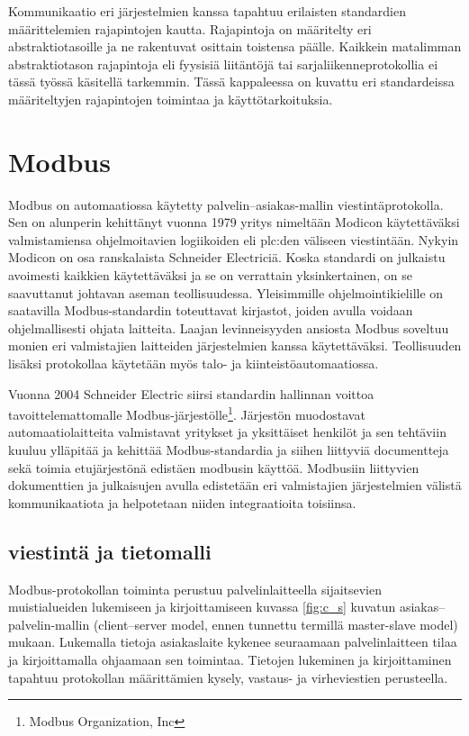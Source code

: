 Kommunikaatio eri järjestelmien kanssa tapahtuu erilaisten standardien määrittelemien rajapintojen kautta. Rajapintoja on määritelty eri abstraktiotasoille ja ne rakentuvat osittain toistensa päälle. Kaikkein matalimman abstraktiotason rajapintoja eli fyysisiä liitäntöjä tai sarjaliikenneprotokollia ei tässä työssä käsitellä tarkemmin. Tässä kappaleessa on kuvattu eri standardeissa määriteltyjen rajapintojen toimintaa ja käyttötarkoituksia.

\section{Modbus}

  Modbus on automaatiossa käytetty palvelin--asiakas-mallin viestintäprotokolla. Sen on alunperin kehittänyt vuonna 1979 yritys nimeltään Modicon käytettäväksi valmistamiensa ohjelmoitavien logiikoiden eli \Gls{plc}:den väliseen viestintään. Nykyin Modicon on osa ranskalaista Schneider Electriciä. Koska standardi on julkaistu avoimesti kaikkien käytettäväksi ja se on verrattain yksinkertainen, on se saavuttanut johtavan aseman teollisuudessa. Yleisimmille ohjelmointikielille on saatavilla Modbus-standardin toteuttavat kirjastot, joiden avulla voidaan ohjelmallisesti ohjata laitteita. Laajan levinneisyyden ansiosta Modbus soveltuu monien eri valmistajien laitteiden järjestelmien kanssa käytettäväksi. Teollisuuden lisäksi protokollaa käytetään myös talo- ja kiinteistöautomaatiossa.\parencite{sousaPortugal, modbusAppSpec, modbusOrg}

  Vuonna 2004 Schneider Electric siirsi standardin hallinnan voittoa tavoittelemattomalle Modbus-järjestölle\footnote{Modbus Organization, Inc}. Järjestön muodostavat automaatiolaitteita valmistavat yritykset ja yksittäiset henkilöt ja sen tehtäviin kuuluu ylläpitää ja kehittää Modbus-standardia ja siihen liittyviä documentteja sekä toimia etujärjestönä edistäen modbusin käyttöä. Modbusiin liittyvien dokumenttien ja julkaisujen avulla edistetään eri valmistajien järjestelmien välistä kommunikaatiota ja helpotetaan niiden integraatioita toisiinsa.  \parencite{modbusOrg}

  \subsection{viestintä ja tietomalli}

  Modbus-protokollan toiminta perustuu palvelinlaitteella sijaitsevien muistialueiden lukemiseen ja kirjoittamiseen kuvassa \ref{fig:c_s} kuvatun asiakas--palvelin-mallin (client--server model, ennen tunnettu termillä master-slave model) mukaan.  Lukemalla tietoja asiakaslaite kykenee seuraamaan palvelinlaitteen tilaa ja kirjoittamalla ohjaamaan sen toimintaa. Tietojen lukeminen ja kirjoittaminen tapahtuu protokollan määrittämien kysely, vastaus- ja virheviestien perusteella.\parencite{modbusAppSpec}

